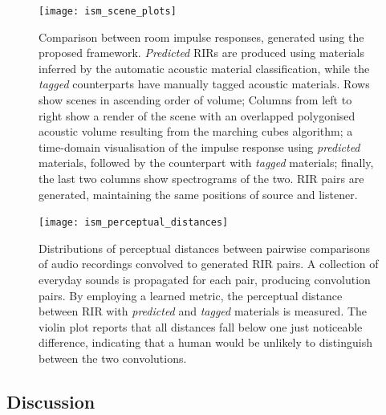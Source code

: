\begin{figure}[htbp]
    \centering
    \texttt{[image: ism\_scene\_plots]}
    \caption{Comparison between room impulse responses, generated using the proposed framework. \emph{Predicted} RIRs are produced using materials inferred by the automatic acoustic material classification, while the \emph{tagged} counterparts have manually tagged acoustic materials. Rows show scenes in ascending order of volume; Columns from left to right show a render of the scene with an overlapped polygonised acoustic volume resulting from the marching cubes algorithm; a time-domain visualisation of the impulse response using \emph{predicted} materials, followed by the counterpart with \emph{tagged} materials; finally, the last two columns show spectrograms of the two. RIR pairs are generated, maintaining the same positions of source and listener.}
    \label{fig:ism_scene_plots}
\end{figure}

\begin{figure}[htbp]
 \centering %
 \texttt{[image: ism\_perceptual\_distances]}
 \caption{Distributions of perceptual distances between pairwise comparisons of audio recordings convolved to generated RIR pairs.
A collection of everyday sounds is propagated for each pair, producing convolution pairs. By employing a learned metric, the perceptual distance between RIR with \emph{predicted} and \emph{tagged} materials is measured. The violin plot reports that all distances fall below one just noticeable difference, indicating that a human would be unlikely to distinguish between the two convolutions.}
 \label{fig:ism_perceptual_evaluation}
\end{figure}

\subsection{Discussion}
